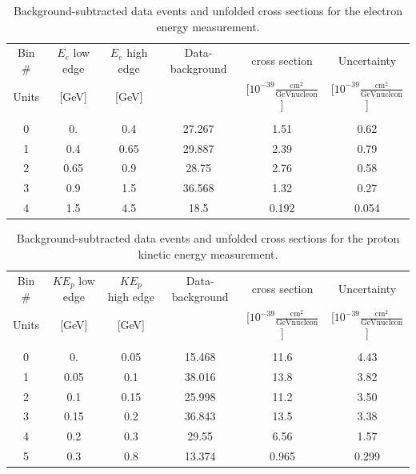 \documentclass[amsmath,amssymb,aps,prd,showpacs,twocolumn,superscriptaddress,letterpaper,longbibliography, floatfix]{revtex4-2}
\begin{document}
\begin{table}[H]
\caption{Background-subtracted data events and unfolded cross sections for the electron energy measurement.}
\label{tbl:ResEe}
\begin{center}
\begin{tabular}{|c|c|c|c|c|c|}
\hline
Bin \# & $E_e$ low edge & $E_e$ high edge  & Data-background&  cross section  & Uncertainty   \\
Units& [GeV]&[GeV]&&[$10^{-39}\frac{\mathrm{cm^2}}{\mathrm{GeV nucleon}}$]&[$10^{-39}\frac{\mathrm{cm^2}}{\mathrm{GeV nucleon}}$]\\
&&&&&\\
0&0.&0.4& 27.267&1.51&0.62\\
1&0.4&0.65&29.887&2.39&0.79\\
2&0.65&0.9&28.75&2.76&0.58\\
3&0.9&1.5&36.568&1.32&0.27\\
4&1.5&4.5&18.5&0.192&0.054\\

\hline
\end{tabular} 
\end{center}
\end{table}\FloatBarrier



\begin{table}[H]
\caption{Background-subtracted data events and unfolded cross sections for the proton kinetic energy measurement.}
\label{tbl:ResPe}
\begin{center} 
\begin{tabular}{|c|c|c|c|c|c|}
\hline
Bin \# & $KE_{p}$ low edge & $KE_{p}$ high edge  & Data-background&  cross section  & Uncertainty   \\
Units& [GeV]&[GeV]&&[$10^{-39}\frac{\mathrm{cm^2}}{\mathrm{GeV nucleon}}$]&[$10^{-39}\frac{\mathrm{cm^2}}{\mathrm{GeV nucleon}}$]\\
&&&&&\\
0&0.&0.05& 15.468&11.6&4.43\\
1&0.05&0.1&38.016&13.8&3.82\\
2&0.1&0.15&25.998&11.2&3.50\\
3&0.15&0.2&36.843&13.5&3.38\\
4&0.2&0.3&29.55&6.56&1.57\\
5&0.3&0.8&13.374&0.965&0.299\\
\hline
\end{tabular} \end{center}
\end{table}\FloatBarrier
\end{document}
